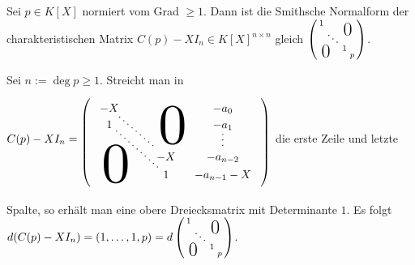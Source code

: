 \documentclass[../../main.tex]{subfiles}
\begin{document}
\begin{lem}\label{17.5.2}
    Sei $p\in K[X]$ normiert vom Grad $\ge 1$. Dann ist die Smithsche Normalform der charakteristischen Matrix $C(p)-XI_n\in K[X]^{n\times n}$ gleich $\left(
        \begin{smallmatrix}
            1 & & &\llap{$\overset{\blap{\LARGE 0}}{~}$} \\
            & \ddots & &\\
            & & 1 &\\
            \rlap{\tlap{\LARGE 0}}& & & p    
        \end{smallmatrix}    
    \right)$.
\end{lem}
\begin{cproof}
    Sei $n:=\deg p\ge 1$. Streicht man in $C(p)-XI_n=
    \begin{tikzpicture}[loosely dotted,thick,baseline]
        \matrix (m) [matrix of math nodes,nodes in empty cells,right delimiter=),left delimiter=(,column sep=1em]{
            -X&&&-a_0\\
            1&&&-a_1\\
            &&&\\
            &&&\\
            &&-X&-a_{n-2}\\
            &&1&-a_{n-1}-X\\
        } ;
        \node at (m-1-3.south) [anchor=center, xshift=0.2cm,yshift=-0.3cm,  xscale=5, yscale=5] {$0$};
        \node at (m-6-1.north) [anchor=center, xshift=0.2cm,yshift=0.3cm,  xscale=5, yscale=5] {$0$};
        \draw (m-2-4)-- (m-5-4);
        \draw (m-1-1)-- (m-5-3);
        \draw (m-2-1)-- (m-6-3);
    \end{tikzpicture}$
    die erste Zeile und letzte Spalte, so erhält man eine obere Dreiecksmatrix mit Determinante $1$. Es folgt $d(C(p)-XI_n)=(1,\ldots ,1,p)=d\left(
        \begin{smallmatrix}
            1 & & &\llap{$\overset{\blap{\LARGE 0}}{~}$} \\
            & \ddots & &\\
            & & 1 &\\
            \rlap{\tlap{\LARGE 0}}& & & p
        \end{smallmatrix}
    \right)$.
\end{cproof}
\end{document}
